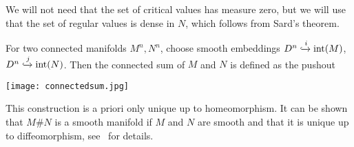 \documentclass[a4paper,12pt]{article}
\begin{document}
\begin{remark}
    We will not need that the set of critical values has measure zero, but we will use that the set of regular values is dense in \(N\), which follows from Sard's theorem.
\end{remark}

\begin{definition}
    For two connected manifolds \(M^n,N^n\), choose smooth embeddings \(D^n\xhookrightarrow{i}\mathrm{int}(M)\), \(D^n\xhookrightarrow{j}\mathrm{int}(N)\). Then the connected sum of \(M\) and \(N\) is defined as the pushout %
    \begin{center}
    \end{center}
    \begin{center}
        \texttt{[image: connectedsum.jpg]}
    \end{center}
\end{definition}

\begin{remark}
    This construction is a priori only unique up to homeomorphism. It can be shown that \(M\#N\) is a smooth manifold if \(M\) and \(N\) are smooth and that it is unique up to diffeomorphism, see\ \cite[VI, Theorem 1.1.]{kosinski} for details.
\end{remark}



\end{document}
